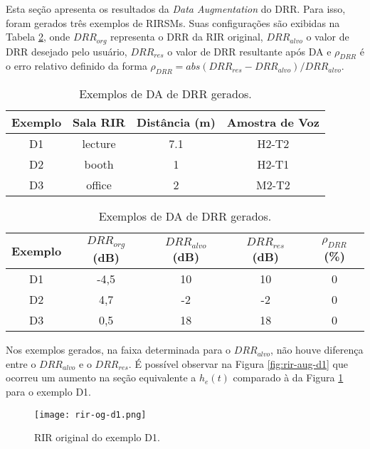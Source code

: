 Esta seção apresenta os resultados da \textit{Data Augmentation} do DRR. Para isso, foram gerados três exemplos de RIRSMs. Suas configurações
são exibidas na Tabela \ref{tbl:da-drr}, onde $DRR_{org}$ representa o DRR da RIR original, $DRR_{alvo}$ o valor de DRR desejado pelo usuário,
$DRR_{res}$ o valor de DRR resultante após DA e $\rho_{DRR}$ é o erro relativo definido da forma $\rho_{DRR} = abs(DRR_{res} - DRR_{alvo})/DRR_{alvo}$.

\begin{table} [H]
    \centering
    \caption{Exemplos de DA de DRR gerados.}
    \label{tbl:da-drr}
    \begin{tabular}{c|c|c|c}

        \textbf{Exemplo} & 
        \textbf{Sala RIR} & 
        \textbf{Distância (m)} &
        \textbf{Amostra de Voz} \\
        \hline 

        D1 & lecture & 7.1 & H2-T2 \\
        D2 & booth & 1 & H2-T1 \\
        D3 & office & 2 & M2-T2 \\

    \end{tabular}
    \bigbreak
    \bigbreak
    \begin{tabular}{c|c|c|c|c}

        \textbf{Exemplo} & 
        \textbf{$DRR_{org}$ (dB)} & 
        \textbf{$DRR_{alvo}$ (dB)} &
        \textbf{$DRR_{res}$ (dB)} & 
        \textbf{$\rho_{DRR}$ (\%)} \\
        \hline 

        D1 & -4,5 & 10 & 10 & 0 \\
        D2 & 4,7 & -2 & -2 & 0 \\
        D3 & 0,5 & 18 & 18 & 0 \\

    \end{tabular}
\end{table}


Nos exemplos gerados, na faixa determinada para o $DRR_{alvo}$, não houve diferença entre o $DRR_{alvo}$ e o $DRR_{res}$.
É possível observar na Figura \ref{fig:rir-aug-d1} que ocorreu um aumento na seção equivalente a $h_e(t)$ comparado à da Figura \ref{fig:rir-og-d1}
para o exemplo D1.

\begin{figure} [H]
    \centering
    \texttt{[image: rir-og-d1.png]}
    \caption{RIR original do exemplo D1.}
    \label{fig:rir-og-d1}
\end{figure} 

